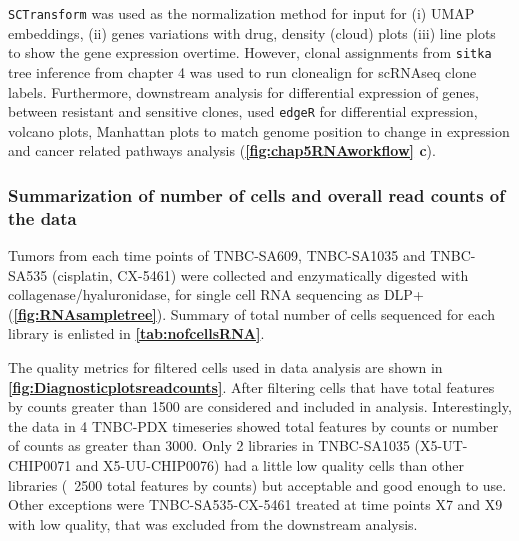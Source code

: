 \texttt{SCTransform} \cite{hafemeister2019normalization} was used as the normalization method for input for (i) \ac{UMAP} embeddings, (ii) genes variations with drug, density (cloud) plots (iii) line plots to show the gene expression overtime. However, clonal assignments from \texttt{sitka} tree inference from chapter 4 was used to run clonealign \cite{campbell2019clonealign} for \ac{scRNAseq} clone labels. Furthermore, downstream analysis for differential expression of genes, between resistant and sensitive clones, used \texttt{edgeR} \cite{robinson2010edger} for differential expression, volcano plots, Manhattan plots to match genome position to change in expression and cancer related pathways analysis (\textbf{\autoref{fig:chap5RNAworkflow} c}).


\subsubsection{Summarization of number of cells and overall read counts of the data}
Tumors from each time points of TNBC-SA609, TNBC-SA1035 and TNBC-SA535 (cisplatin, CX-5461) were collected and enzymatically digested with collagenase/hyaluronidase, for single cell RNA sequencing as DLP+ (\textbf{\autoref{fig:RNAsampletree}}).
Summary of total number of cells sequenced for each library is enlisted in \textbf{\autoref{tab:nofcellsRNA}}. 

The quality metrics for filtered cells used in data analysis are shown in 
\textbf{\autoref{fig:Diagnosticplotsreadcounts}}. 
After filtering cells that have total features by counts greater than 1500 are considered and included in analysis. Interestingly, the data in 4 TNBC-PDX timeseries showed total features by counts or number of counts as greater than 3000.
Only 2 libraries in TNBC-SA1035 (X5-UT-CHIP0071 and X5-UU-CHIP0076) had a little low quality cells than other libraries (~2500 total features by counts) but acceptable and good enough to use. Other exceptions were TNBC-SA535-CX-5461 treated at time points X7 and X9 with low quality, that was excluded from the downstream analysis. 



